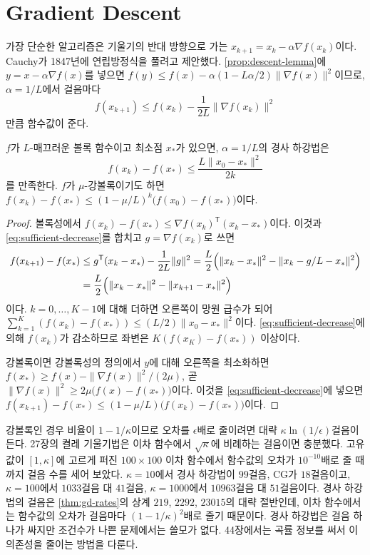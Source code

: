 \section{Gradient Descent}
\label{sec:gradient-descent}

가장 단순한 알고리즘은 기울기의 반대 방향으로 가는  $x_{k+1}=x_k-\alpha\nabla f(x_k)$이다. Cauchy가 1847년에 연립방정식을 풀려고 제안했다\cite{cauchy1847,lemarechal2012cauchy}. \cref{prop:descent-lemma}에 $y=x-\alpha\nabla f(x)$를 넣으면 $f(y)\le f(x)-\alpha(1-L\alpha/2)\|\nabla f(x)\|^2$이므로, $\alpha=1/L$에서 걸음마다
\begin{equation}
\label{eq:sufficient-decrease}
f(x_{k+1})\le f(x_k)-\frac1{2L}\|\nabla f(x_k)\|^2
\end{equation}
만큼 함수값이 준다.

\begin{theorem}
\label{thm:gd-rates}
$f$가 $L$-매끄러운 볼록 함수이고 최소점 $x_\ast$가 있으면, $\alpha=1/L$의 경사 하강법은
\[
f(x_k)-f(x_\ast)\le\frac{L\|x_0-x_\ast\|^2}{2k}
\]
를 만족한다. $f$가 $\mu$-강볼록이기도 하면 $f(x_k)-f(x_\ast)\le(1-\mu/L)^k\bigl(f(x_0)-f(x_\ast)\bigr)$이다.
\end{theorem}

\begin{proof}
볼록성에서 $f(x_k)-f(x_\ast)\le\nabla f(x_k)^{\mathsf T}(x_k-x_\ast)$이다. 이것과 \eqref{eq:sufficient-decrease}를 합치고 $g=\nabla f(x_k)$로 쓰면
\begin{align*}
f(x_{k+1})-f(x_\ast)&\le g^{\mathsf T}(x_k-x_\ast)-\frac1{2L}\|g\|^2=\frac L2\Bigl(\|x_k-x_\ast\|^2-\|x_k-g/L-x_\ast\|^2\Bigr)\\
&=\frac L2\Bigl(\|x_k-x_\ast\|^2-\|x_{k+1}-x_\ast\|^2\Bigr)
\end{align*}
이다. $k=0,\dots,K-1$에 대해 더하면 오른쪽이 망원 급수가 되어 $\sum_{k=1}^K(f(x_k)-f(x_\ast))\le(L/2)\|x_0-x_\ast\|^2$이다. \eqref{eq:sufficient-decrease}에 의해 $f(x_k)$가 감소하므로 좌변은 $K(f(x_K)-f(x_\ast))$ 이상이다.

강볼록이면 강볼록성의 정의에서 $y$에 대해 오른쪽을 최소화하면 $f(x_\ast)\ge f(x)-\|\nabla f(x)\|^2/(2\mu)$, 곧 $\|\nabla f(x)\|^2\ge2\mu\bigl(f(x)-f(x_\ast)\bigr)$이다. 이것을 \eqref{eq:sufficient-decrease}에 넣으면 $f(x_{k+1})-f(x_\ast)\le(1-\mu/L)\bigl(f(x_k)-f(x_\ast)\bigr)$이다.
\end{proof}

강볼록인 경우 비율이 $1-1/\kappa$이므로 오차를 $\epsilon$배로 줄이려면 대략 $\kappa\ln(1/\epsilon)$걸음이 든다. 27장의 켤레 기울기법은 이차 함수에서 $\sqrt\kappa$에 비례하는 걸음이면 충분했다. 고유값이 $[1,\kappa]$에 고르게 퍼진 $100\times100$ 이차 함수에서 함수값의 오차가 $10^{-10}$배로 줄 때까지 걸음 수를 세어 보았다. $\kappa=10$에서 경사 하강법이 $99$걸음, CG가 $18$걸음이고, $\kappa=100$에서 $1033$걸음 대 $41$걸음, $\kappa=1000$에서 $10963$걸음 대 $51$걸음이다. 경사 하강법의 걸음은 \cref{thm:gd-rates}의 상계 $219$, $2292$, $23015$의 대략 절반인데, 이차 함수에서는 함수값의 오차가 걸음마다 $(1-1/\kappa)^2$배로 줄기 때문이다. 경사 하강법은 걸음 하나가 싸지만 조건수가 나쁜 문제에서는 쓸모가 없다. 44장에서는 곡률 정보를 써서 이 의존성을 줄이는 방법을 다룬다\cite{nesterov2018}.

